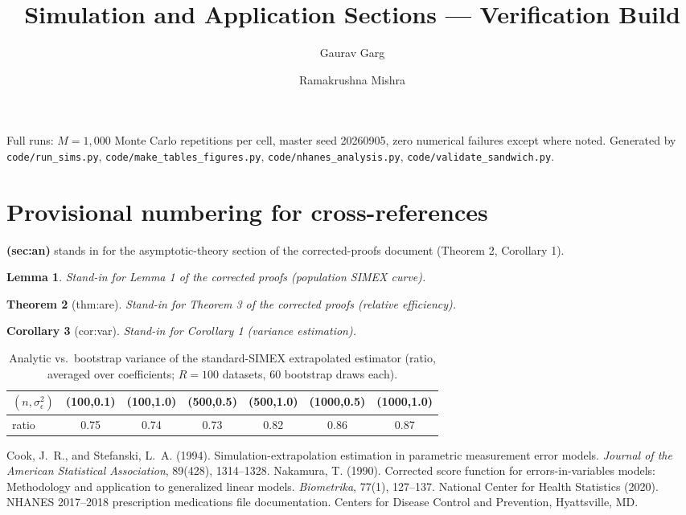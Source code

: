 \documentclass[11pt]{article}
\newtheorem{theorem}{Theorem}
\newtheorem{lemma}[theorem]{Lemma}
\newtheorem{corollary}[theorem]{Corollary}
\begin{document}
\title{Simulation and Application Sections --- Verification Build}
\author{Gaurav Garg \and Ramakrushna Mishra}
\maketitle

Full runs: $M=1{,}000$ Monte Carlo repetitions per cell, master seed
20260905, zero numerical failures except where noted. Generated by
\texttt{code/run\_sims.py}, \texttt{code/make\_tables\_figures.py},
\texttt{code/nhanes\_analysis.py}, \texttt{code/validate\_sandwich.py}.

\section*{Provisional numbering for cross-references}
\label{sec:an}
\textbf{(sec:an)} stands in for the asymptotic-theory section of the
corrected-proofs document (Theorem 2, Corollary 1).
\begin{lemma}\label{lem:curve}
Stand-in for Lemma 1 of the corrected proofs (population SIMEX curve).
\end{lemma}
\begin{theorem}[thm:are]\label{thm:are}
Stand-in for Theorem 3 of the corrected proofs (relative efficiency).
\end{theorem}
\begin{corollary}[cor:var]\label{cor:var}
Stand-in for Corollary 1 (variance estimation).
\end{corollary}

\setcounter{section}{4}



\begin{table}[t]
\centering\footnotesize
\caption{Analytic vs.\ bootstrap variance of the standard-SIMEX
extrapolated estimator (ratio, averaged over coefficients; $R=100$
datasets, $60$ bootstrap draws each).}\label{tab:sandwich-val}
\begin{tabular}{lcccccc}
\toprule
$(n,\sigma^2_\epsilon)$ & (100,0.1) & (100,1.0) & (500,0.5) & (500,1.0)
& (1000,0.5) & (1000,1.0) \\
\midrule
ratio & 0.75 & 0.74 & 0.73 & 0.82 & 0.86 & 0.87 \\
\bottomrule
\end{tabular}
\end{table}

\begin{thebibliography}{9}
Cook, J.~R., and Stefanski, L.~A. (1994). Simulation-extrapolation
estimation in parametric measurement error models.
\emph{Journal of the American Statistical Association}, 89(428),
1314--1328.
Nakamura, T. (1990). Corrected score function for errors-in-variables
models: Methodology and application to generalized linear models.
\emph{Biometrika}, 77(1), 127--137.
National Center for Health Statistics (2020). NHANES 2017--2018
prescription medications file documentation. Centers for Disease
Control and Prevention, Hyattsville, MD.
\end{thebibliography}
\end{document}
